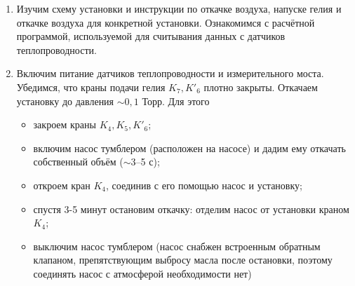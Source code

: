 \documentclass[12pt,a4paper]{article}
\begin{document}
\begin{enumerate}
\item Изучим схему установки и инструкции по откачке воздуха, напуске гелия и откачке воздуха для конкретной установки. Ознакомимся с расчётной программой, используемой для считывания данных с датчиков теплопроводности. 
\item Включим питание датчиков теплопроводности и измерительного моста. Убедимся, что краны подачи гелия $K_7, K'_6$ плотно закрыты. Откачаем установку до давления $\sim 0,1$ Торр. Для этого
\begin{itemize}
\item закроем краны $K_4, K_5, K'_6$;
\item включим насос тумблером (расположен на насосе) и дадим ему откачать собственный объём ($\sim $3–5 с);
\item откроем кран $K_4$, соединив с его помощью насос и установку;
\item спустя 3-5 минут остановим откачку: отделим насос от установки краном $K_4$;
\item выключим насос тумблером (насос снабжен встроенным обратным клапаном, препятствующим выбросу масла после остановки, поэтому соединять насос с атмосферой необходимости нет)
\end{itemize}


\end{enumerate}
\end{document}
